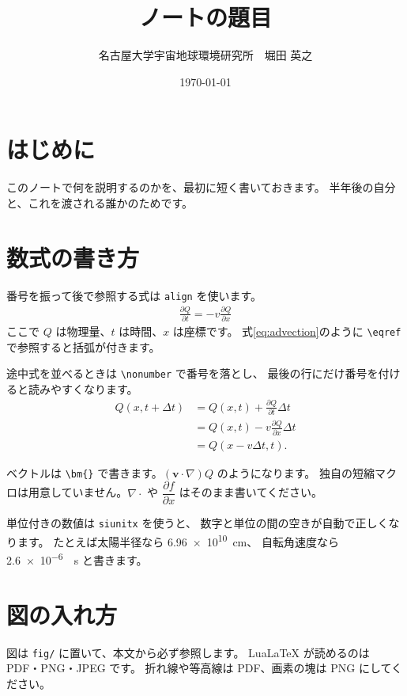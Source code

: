 \documentclass[a4j,12pt]{ltjarticle}
\title{ノートの題目}
\author{名古屋大学宇宙地球環境研究所　堀田 英之}
\date{\today}
\numberwithin{equation}{section}
\begin{document}
\maketitle

\tableofcontents
\clearpage


\section{はじめに}

このノートで何を説明するのかを、最初に短く書いておきます。
半年後の自分と、これを渡される誰かのためです。


\section{数式の書き方}

番号を振って後で参照する式は \texttt{align} を使います。
\begin{align}
  \frac{\partial Q}{\partial t} = -v\frac{\partial Q}{\partial x}
  \label{eq:advection}
\end{align}
ここで $Q$ は物理量、$t$ は時間、$x$ は座標です。
式\eqref{eq:advection}のように \verb|\eqref| で参照すると括弧が付きます。

途中式を並べるときは \verb|\nonumber| で番号を落とし、
最後の行にだけ番号を付けると読みやすくなります。
\begin{align}
  Q(x,t+\Delta t)
   &= Q(x,t) + \frac{\partial Q}{\partial t}\Delta t \nonumber\\
   &= Q(x,t) - v\frac{\partial Q}{\partial x}\Delta t \nonumber\\
   &= Q(x-v\Delta t,t).
  \label{eq:general_advection}
\end{align}

ベクトルは \verb|\bm{}| で書きます。$(\bm{v}\cdot\nabla)Q$ のようになります。
独自の短縮マクロは用意していません。$\nabla\cdot$ や
$\dfrac{\partial f}{\partial x}$ はそのまま書いてください。

単位付きの数値は \texttt{siunitx} を使うと、
数字と単位の間の空きが自動で正しくなります。
たとえば太陽半径なら \qty{6.96e10}{cm}、
自転角速度なら \qty{2.6e-6}{\per\second} と書きます。


\section{図の入れ方}

図は \texttt{fig/} に置いて、本文から必ず参照します。
LuaLaTeX が読めるのは PDF・PNG・JPEG です。
折れ線や等高線は PDF、画素の塊は PNG にしてください。
\end{document}
